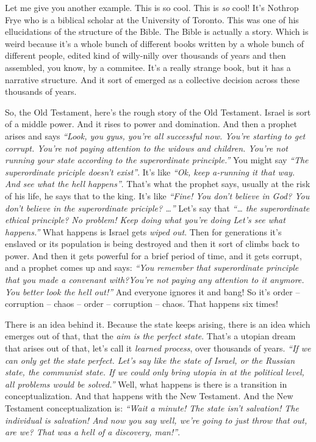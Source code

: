 \documentclass{memoir}
\newcommand{\qq}[1]{\emph{“#1”}}
\begin{document}
\begin{drama}
\jpspeaks Let me give you another example. This is so cool. This is \emph{so} cool! It’s Nothrop Frye who is a biblical scholar at the University of Toronto. This was one of his ellucidations of the structure of the Bible. The Bible is actually a story. Which is weird because it’s a whole bunch of different books written by a whole bunch of different people, edited kind of willy-nilly over thousands of years and then assembled, you know, by a commitee. It’s a really strange book, but it has a narrative structure. And it sort of emerged as a collective decision across these thousands of years.

		So, the Old Testament, here’s the rough story of the Old Testament. Israel is sort of a middle power. And it rises to power and domination. And then a prophet arises and says \qq{Look, you gyus, you’re all successful now. You’re starting to get corrupt. You’re not paying attention to the widows and children. You’re not running your state according to the superordinate principle.} You might say \qq{The superordinate priciple doesn’t exist}. It’s like \qq{Ok, keep a-running it that way. And see what the hell happens}. That’s what the prophet says, usually at the risk of his life, he says that to the king. It’s like \qq{Fine! You don’t believe in God? You don’t believe in the superordinate priciple? \ldots{}} Let’s say that \qq{\ldots{} the superordinate ethical principle? No problem! Keep doing what you’re doing Let’s see what happens.} What happens is Israel gets \emph{wiped out}. Then for generations it’s enslaved or its population is being destroyed and then it sort of climbs back to power. And then it gets powerful for a brief period of time, and it gets corrupt, and a prophet comes up and says: \qq{You remember that superordinate principle that you made a convenant with?You’re not paying any attention to it anymore. You better look the hell out!} And everyone ignores it and bang! So it’s order -- corruption -- chaos -- order -- corruption -- chaos. That happens six times!

There is an idea behind it. Because the state keeps arising, there is an idea which emerges out of that, that the \emph{aim is the perfect state}. That’s a utopian dream that arises out of that, let’s call it \emph{learned process}, over thousands of years. \qq{If we can only get the state perfect. Let’s say like the state of Israel, or the Russian state, the communist state. If we could only bring utopia in at the political level, all problems would be solved.} Well, what happens is there is a transition in conceptualization. And that happens with the New Testament. And the New Testament conceptualization is: \qq{Wait a minute! The state isn’t salvation! The individual is salvation! And now you say well, we’re going to just throw that out, are we? That was a hell of a discovery, man!}.


\end{drama}
\end{document}
